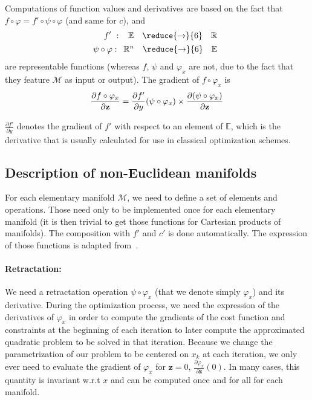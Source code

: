 Computations of function values and derivatives are based on the fact that $f \circ \varphi = f' \circ \psi \circ \varphi$ (and same for $c$), and
\begin{align}
  f'\ :\
  \begin{array}{ccc}
    \mathbb{E} & \reduce{\rightarrow}{6} & \mathbb{R}
  \end{array} \nonumber\\
  \psi\circ\varphi:
  \begin{array}{ccc}
    \mathbb{R}^n & \reduce{\rightarrow}{6} & \mathbb{E}
  \end{array} \nonumber%
\end{align}
are representable functions (whereas $f$, $\psi$ and $\varphi_x$ are not, due to the fact that they feature $\mathcal{M}$ as input or output).
The gradient of $f \circ \varphi_x$ is
\begin{align}
  \frac{\partial f\circ\varphi_x}{\partial {\bf z}}=
  \frac{\partial f'}{\partial y}(\psi\circ\varphi_x)\times
  \frac{\partial (\psi\circ\varphi_x)}{\partial {\bf z}}
\end{align}

$\frac{\partial f'}{\partial y}$ denotes the gradient of $f'$ with respect to an element of $\mathbb{E}$, which is the derivative that is usually calculated for use in classical optimization schemes.

\subsection{Description of non-Euclidean manifolds}
\label{sub:examples_on_non_euclidean_manifolds}

For each elementary manifold $\mathcal{M}$, we need to define a set of elements and operations.
Those need only to be implemented once for each elementary manifold (it is then trivial to get those functions for Cartesian products of manifolds).
The composition with $f'$ and $c'$ is done automatically.
The expression of those functions is adapted from~\cite{boumal:jmlr:2014}.

\paragraph{Retractation:}
We need a retractation operation $\psi\circ\varphi_x$ (that we denote simply $\varphi_x$) and its derivative.
During the optimization process, we need the expression of the derivatives of $\varphi_x$ in order to compute the gradients of the cost function and constraints at the beginning of each iteration to later compute the approximated quadratic problem to be solved in that iteration.
Because we change the parametrization of our problem to be centered on $x_k$ at each iteration, we only ever need to evaluate the gradient of $\varphi_x$ for $\mathbf{z}=0$, $\frac{\partial \varphi_x}{\partial \mathbf{z}}(0)$.
In many cases, this quantity is invariant w.r.t $x$ and can be computed once and for all for each manifold.


